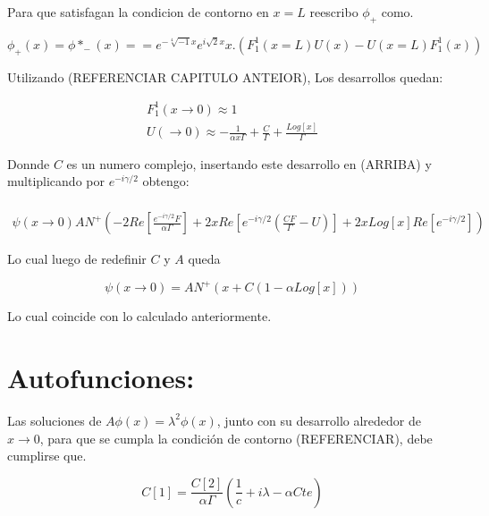 Para que satisfagan la condicion de contorno en $ x=L $ reescribo $ \phi _{+}$ como.

\begin{equation}
\phi _{+} (x) = \phi * _{-} (x) = 
= e ^{- \sqrt[4]{-1} x } e ^{i \sqrt{2} x } x.
\left(
F _1 ^1 (x=L) U(x) - U(x=L) F _1 ^1 (x)
\right)
\end{equation}


Utilizando (REFERENCIAR CAPITULO ANTEIOR), Los desarrollos quedan:

\begin{equation}
\begin{array}{c}
F _1 ^1 (x \rightarrow 0 ) \approx 1 \\
U( \rightarrow 0  ) \approx - \frac{1}{\alpha x \Gamma} + \frac{C}{\Gamma} + \frac{Log[x]}{\Gamma}
\end{array}
\end{equation}


Donnde $C$ es un numero complejo, insertando este desarrollo en (ARRIBA) y multiplicando por $ e ^{- i \gamma /2}$ obtengo:

\begin{equation}
\begin{array}{c} \\
\psi (x \rightarrow 0 )
A N ^{+}
\left(
-2 Re[ \frac{e ^{-i \gamma /2} F}{\alpha \Gamma} ] + 
2 x Re [ e ^{-i \gamma /2} (\frac{C F}{\Gamma} - U ) ] + 
2 x Log[x] Re [ e ^{- i \gamma /2 }]
\right)
\end{array}
\end{equation}

Lo cual luego de redefinir $C$ y $A$ queda 

\begin{equation}
\psi (x \rightarrow 0 ) = A N ^{+} 
\left(
x + C (1- \alpha Log[x] )
\right)
\end{equation}

Lo cual coincide con lo calculado anteriormente.

\section{Autofunciones:}

Las soluciones de $A \phi (x) = \lambda ^2 \phi (x)$, junto con su desarrollo alrededor de $x \rightarrow 0$, para que se cumpla la condición de contorno (REFERENCIAR), debe cumplirse que.


\begin{equation}
C[1] = \frac{C[2] }{\alpha	\Gamma} 
\left(
\frac{1}{c} + i \lambda - \alpha Cte
\right)
\end{equation}

